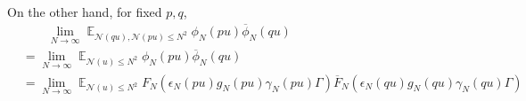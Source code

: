 \documentclass[11pt]{amsart}
\theoremstyle{definition}
\DeclareMathOperator*{\E}{\mathbb{E}}
\newcommand{\NN}{{\mathcal N}}
\begin{document}
On the other hand, for fixed $p,q$, 
\begin{equation}
    \begin{split}
       &\qquad 
       \lim_{N\to\infty}\E_{\NN(qu),\NN(pu)\leq N^{2}}\phi_{N}(pu)\overline{\phi}_{N}(qu)
       \\&=\lim_{N\to\infty}\E_{\NN(u)\leq N^{2}}\phi_{N}(pu)\overline{\phi}_{N}(qu)
       \\&=\lim_{N\to\infty}\E_{\NN(u)\leq N^{2}}F_{N}(\epsilon_{N}(pu)g_{N}(pu)\gamma_{N}(pu)\Gamma)\overline{F}_{N}(\epsilon_{N}(qu)g_{N}(qu)\gamma_{N}(qu)\Gamma)
    \end{split}
\end{equation}
 
\fi




 






\end{document}
